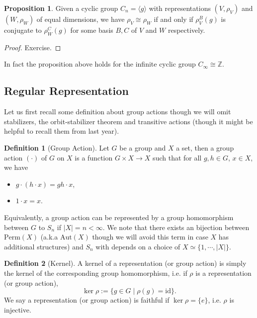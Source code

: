 \documentclass[]{article}
\theoremstyle{definition}
\theoremstyle{definition}
\newtheorem{definition}{Definition}[section]
\newtheorem{proposition}{Proposition}[section]
\begin{document}
\begin{proposition}
  Given a cyclic group \(C_n = \langle g \rangle\) with representations 
  \((V, \rho_V)\) and \((W, \rho_W)\) of equal dimensions, we have 
  \(\rho_V \cong \rho_W\) if and only if \(\rho_V^B(g)\) is conjugate to 
  \(\rho_W^C(g)\) for some basis \(B, C\) of \(V\) and \(W\) respectively.
\end{proposition}
\begin{proof}
  Exercise.
\end{proof}

In fact the proposition above holds for the infinite cyclic group 
\(C_\infty \cong \mathbb{Z}\).

\subsection{Regular Representation}

Let us first recall some definition about group actions though we will omit 
stabilizers, the orbit-stabilizer theorem and transitive actions 
(though it might be helpful to recall them from last year).

\begin{definition}[Group Action]
  Let \(G\) be a group and \(X\) a set, then a group action \((\cdot)\) of 
  \(G\) on \(X\) is a function \(G \times X \to X\) such that for all 
  \(g, h \in G\), \(x \in X\), we have 
  \begin{itemize}
    \item \(g \cdot (h \cdot x) = gh \cdot x\),
    \item \(1 \cdot x = x\).
  \end{itemize}
\end{definition}

Equivalently, a group action can be represented by a group homomorphism between 
\(G\) to \(S_n\) if \(|X| = n < \infty\). We note that there exists an 
bijection between \(\text{Perm}(X)\) (a.k.a \(\text{Aut}(X)\) though we will 
avoid this term in case \(X\) has additional structures) and \(S_n\) with 
depends on a choice of \(X \simeq \{1, \cdots, |X|\}\). 

\begin{definition}[Kernel]
  A kernel of a representation (or group action) is simply the kernel of the 
  corresponding group homomorphism, i.e. if \(\rho\) is a representation 
  (or group action), 
  \[\ker \rho := \{ g \in G \mid \rho(g) = \text{id}\}. \]
  We say a representation (or group action) is faithful if \(\ker \rho = \{e\}\), 
  i.e. \(\rho\) is injective.
\end{definition}
\end{document}
